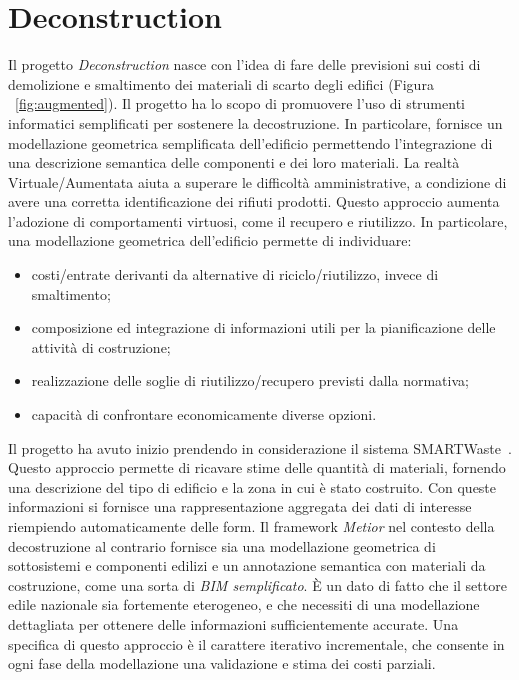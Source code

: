 \section{Deconstruction}
\label{sec:chapter_4_section_2}

Il progetto \emph{Deconstruction} nasce con l'idea di fare delle previsioni
sui costi di demolizione e smaltimento dei materiali di scarto degli edifici (Figura ~\ref{fig:augmented}).
Il progetto ha lo scopo di promuovere l'uso di strumenti informatici semplificati per sostenere la decostruzione.
In particolare, fornisce un modellazione geometrica semplificata dell'edificio permettendo l'integrazione di una descrizione
semantica delle componenti e dei loro materiali.
La realtà Virtuale/Aumentata aiuta a superare le difficoltà amministrative, a condizione di avere una
corretta identificazione dei rifiuti prodotti. Questo approccio aumenta l'adozione di comportamenti virtuosi,
come il recupero e riutilizzo.
In particolare, una modellazione geometrica dell'edificio permette di individuare:
\begin{itemize}
  \item  costi/entrate derivanti da alternative di riciclo/riutilizzo, invece di smaltimento;
  \item  composizione ed integrazione di informazioni utili per la pianificazione delle attività di costruzione;
  \item  realizzazione delle soglie di riutilizzo/recupero previsti dalla normativa;
  \item  capacità di confrontare economicamente diverse opzioni.
\end{itemize}

Il progetto ha avuto inizio prendendo in considerazione il sistema SMARTWaste~\cite{smartWaste}.
Questo approccio permette di ricavare stime delle quantità di materiali, fornendo una descrizione del tipo di edificio
e la zona in cui è stato costruito. Con queste informazioni si fornisce una rappresentazione aggregata dei dati di
interesse riempiendo automaticamente delle form.
Il framework \emph{Metior} nel contesto della decostruzione al contrario fornisce sia una modellazione geometrica di sottosistemi
e componenti edilizi e un annotazione semantica con materiali da costruzione, come una sorta di \emph{BIM semplificato}.
È un dato di fatto che il settore edile nazionale sia fortemente eterogeneo, e che necessiti di una modellazione
dettagliata per ottenere delle informazioni sufficientemente accurate.
Una specifica di questo approccio è il carattere iterativo incrementale,
che consente in ogni fase della modellazione una validazione e stima dei costi parziali.

